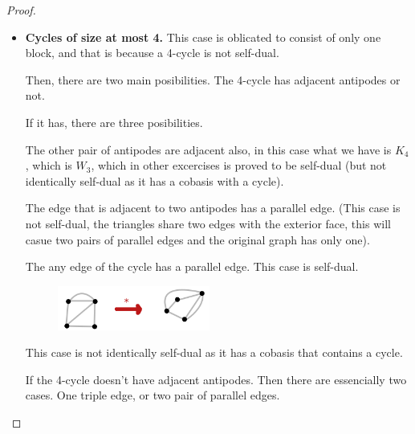 \begin{proof}
\begin{enumerate}[label=(\roman*)]
\begin{itemize}
                    \item \textbf{Cycles of size at most 4.} 
                        This case is oblicated to consist of only one block, and that is because a
                        4-cycle is not self-dual.
                        
                        Then, there are two main posibilities. The 4-cycle has adjacent antipodes or not.\pn 
                        
                        If it has, there are three posibilities.\pn 
                        
                        The other pair of antipodes are adjacent also, in this 
                        case what we have is $K_4$, which is $W_3$, which in other excercises is proved to be self-dual 
                        (but not identically self-dual as it has a cobasis with a cycle).\pn
                        
                        The edge that is adjacent to two antipodes has a parallel edge. (This case is not self-dual, the triangles share two edges
                        with the exterior face, this will casue two pairs of parallel edges and the original graph has only one).\pn
                        
                        The any edge of the cycle has a parallel edge. This case is self-dual.\pn
                        \begin{figure}[H]
                            \begin{center}
                            \includegraphics[width=5cm]{Test2/Problem1/4_Xplus1.png}
                            \end{center}                        
                        \end{figure}\pn
                        This case is not identically self-dual as it has a cobasis that contains a cycle.
                                                
                        If the 4-cycle doesn't have adjacent antipodes. Then there are essencially two cases. One triple edge, or
                        two pair of parallel edges.\pn
                        

\end{itemize}
\end{enumerate}
\end{proof}
